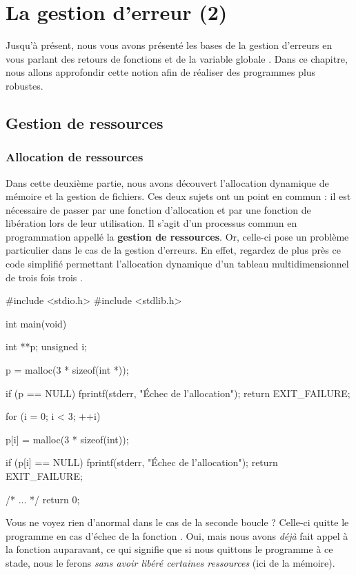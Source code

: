 \chapter{La gestion d'erreur (2)}
\label{la-gestion-d-erreur-(2)}

Jusqu'à présent, nous vous avons présenté les bases de la gestion 
d'erreurs en vous parlant des retours de fonctions et de la variable 
globale . Dans ce chapitre, nous allons approfondir 
cette notion afin de réaliser des programmes plus robustes.

\section{Gestion de ressources}
\label{gestion-de-ressources}

\subsection{Allocation de ressources}
\label{allocation-de-ressources}

Dans cette deuxième partie, nous avons découvert l'allocation dynamique
de mémoire et la gestion de fichiers. Ces deux sujets ont un point en
commun : il est nécessaire de passer par une fonction d'allocation et
par une fonction de libération lors de leur utilisation. Il s'agit d'un
processus commun en programmation appellé la \textbf{gestion de
ressources}. Or, celle-ci pose un problème particulier dans le cas de la
gestion d'erreurs. En effet, regardez de plus près ce code simplifié
permettant l'allocation dynamique d'un tableau multidimensionnel de
trois fois trois .

\begin{C}
#include <stdio.h>
#include <stdlib.h>


int main(void)
{
    int **p;
    unsigned i;

    p = malloc(3 * sizeof(int *));

    if (p == NULL)
    {
        fprintf(stderr, "Échec de l'allocation\n");
        return EXIT_FAILURE;
    }

    for (i = 0; i < 3; ++i)
    {
        p[i] = malloc(3 * sizeof(int));

        if (p[i] == NULL)
        {
            fprintf(stderr, "Échec de l'allocation\n");
            return EXIT_FAILURE;
        }
    }

    /* ... */
    return 0;
}
\end{C}

Vous ne voyez rien d'anormal dans le cas de la seconde boucle ? Celle-ci
quitte le programme en cas d'échec de la fonction .
Oui, mais nous avons \emph{déjà} fait appel à la fonction
 auparavant, ce qui signifie que si nous quittons le
programme à ce stade, nous le ferons \emph{sans avoir libéré certaines
ressources} (ici de la mémoire).

